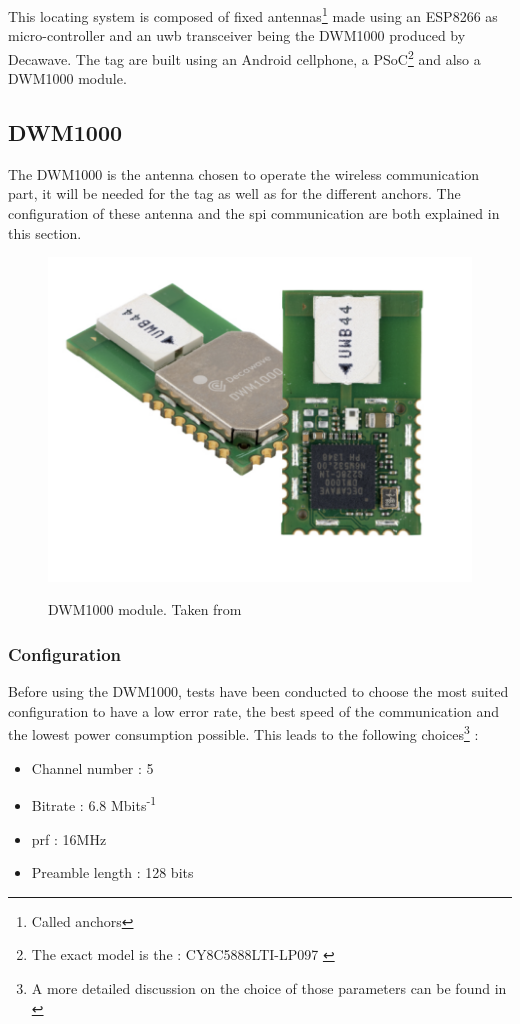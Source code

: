This locating system is composed of fixed antennas\footnote{Called anchors} made using an ESP8266 as micro-controller and an \gls{uwb} transceiver being the DWM1000 produced by Decawave\cite{decawave}. The tag are built using an Android cellphone, a PSoC\footnote{The exact model is the : CY8C5888LTI-LP097 \cite{guyard2019navigation}} and also a DWM1000 module.

\subsection{DWM1000}

The DWM1000 is the antenna chosen to operate the wireless communication part, it will be needed for the tag as well as for the different anchors. The configuration of these antenna and the \gls{spi} communication are both explained in this section.

\begin{figure}[H]
	\centering
	\includegraphics[width=.3\linewidth]{Images/DWM1000.png}
	\label{fig:dwm1000}
	\caption{DWM1000 module. Taken from \cite{decawave}}
\end{figure}

\subsubsection{Configuration}

Before using the DWM1000, tests have been conducted to choose the most suited configuration to have a low error rate, the  best speed of the communication and the lowest power consumption possible. This leads to the following choices\footnote{A more detailed discussion on the choice of those parameters can be found in \cite{hannotier2019indoor}} :

\begin{itemize}
\item Channel number : 5
\item Bitrate : 6.8 Mbits\textsuperscript{-1}
\item \gls{prf} : 16MHz
\item Preamble length : 128 bits
\end{itemize}

